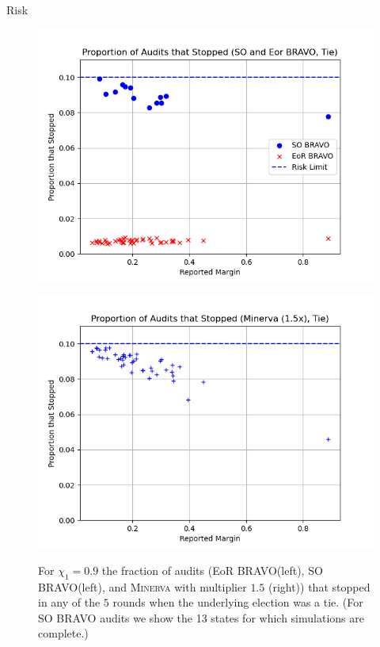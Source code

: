\documentclass[final]{beamer}
\newcommand{\Minerva}{\textsc{Minerva}\xspace}
\newcommand{\BRAVO}{\textsc{BRAVO}\xspace}
\newlength{\colwidth}
\begin{document}
\begin{frame}[t]
\begin{columns}[t]
\begin{column}{\colwidth}
\begin{block}{Risk}
\begin{figure}[h]
\centering
\begin{minipage}{.49\textwidth}
\includegraphics[width=\textwidth]{bravo_risks.png}
\label{fig:bravo_risk}
\end{minipage}
\begin{minipage}{.49\textwidth}
\includegraphics[width=1.0\textwidth]{riskminerva1p5_10t4.png}
\label{fig:minerva_risk}
\end{minipage}
\caption{For $\chi_1=0.9$ the fraction of audits (EoR \BRAVO (left), SO \BRAVO (left), and \Minerva with multiplier $1.5$ (right)) that stopped in any of the $5$ rounds when the underlying election was a tie. (For SO \BRAVO audits we show the 13 states for which simulations are complete.)}
\end{figure}


\end{block}
\end{column}
\end{columns}
\end{frame}
\end{document}
